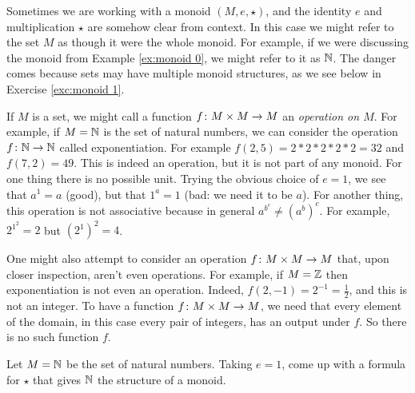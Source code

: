\begin{exampleRUS}\label{ex:monoid 0}
\end{exampleRUS}

\begin{remarkENG}
Sometimes we are working with a monoid $(M,e,\star)$, and the identity $e$ and multiplication $\star$ are somehow clear from context. In this case we might refer to the set $M$ as though it were the whole monoid. For example, if we were discussing the monoid from Example \ref{ex:monoid 0}, we might refer to it as ${\mathbb N}$. The danger comes because sets may have multiple monoid structures, as we see below in Exercise \ref{exc:monoid 1}. 
\end{remarkENG}

\begin{remarkRUS}
\end{remarkRUS}

\begin{exampleENG}
If $M$ is a set, we might call a function $f\colon M\times M\rightarrow M$ an {\em operation on $M$}. For example, if $M={\mathbb N}$ is the set of natural numbers, we can consider the operation $f\colon{\mathbb N}\rightarrow{\mathbb N}$ called exponentiation. For example $f(2,5)=2*2*2*2*2=32$ and $f(7,2)=49.$ This is indeed an operation, but it is not part of any monoid. For one thing there is no possible unit. Trying the obvious choice of $e=1$, we see that $a^1=a$ (good), but that $1^a=1$ (bad: we need it to be $a$). For another thing, this operation is not associative because in general $a^{b^c}\neq (a^b)^c$. For example, $2^{1^2}=2$ but $(2^1)^2=4$. 

One might also attempt to consider an operation $f\colon M\times M\rightarrow M$ that, upon closer inspection, aren't even operations. For example, if $M={\mathbb Z}$ then exponentiation is not even an operation. Indeed, $f(2,-1)=2^{-1}=\frac{1}{2}$, and this is not an integer. To have a function $f\colon M\times M\rightarrow M$, we need that every element of the domain, in this case every pair of integers, has an output under $f$. So there is no such function $f$. 
\end{exampleENG}

\begin{exampleRUS}
\end{exampleRUS}

\begin{exerciseENG}\label{exc:monoid 1}
Let $M={\mathbb N}$ be the set of natural numbers. Taking $e=1$, come up with a formula for $\star$ that gives ${\mathbb N}$ the structure of a monoid.
\end{exerciseENG}

